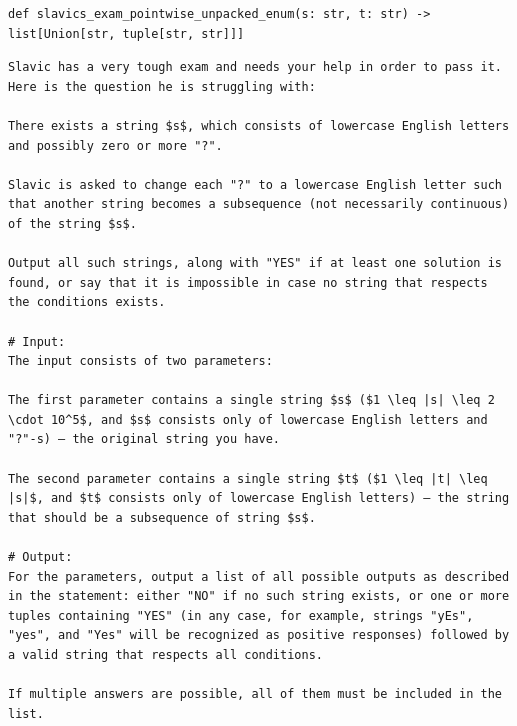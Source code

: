 \documentclass[acmsmall,screen,nonacm]{acmart}
\begin{document}
{\scriptsize
\begin{tcolorbox}[mybox,breakable,title={Answer enumeration problem}]
\begin{verbatim}
def slavics_exam_pointwise_unpacked_enum(s: str, t: str) -> list[Union[str, tuple[str, str]]]
\end{verbatim}
\begin{verbatim}
Slavic has a very tough exam and needs your help in order to pass it. Here is the question he is struggling with:

There exists a string $s$, which consists of lowercase English letters and possibly zero or more "?".

Slavic is asked to change each "?" to a lowercase English letter such that another string becomes a subsequence (not necessarily continuous) of the string $s$.

Output all such strings, along with "YES" if at least one solution is found, or say that it is impossible in case no string that respects the conditions exists.

# Input:
The input consists of two parameters:

The first parameter contains a single string $s$ ($1 \leq |s| \leq 2 \cdot 10^5$, and $s$ consists only of lowercase English letters and "?"-s) — the original string you have.

The second parameter contains a single string $t$ ($1 \leq |t| \leq |s|$, and $t$ consists only of lowercase English letters) — the string that should be a subsequence of string $s$.

# Output:
For the parameters, output a list of all possible outputs as described in the statement: either "NO" if no such string exists, or one or more tuples containing "YES" (in any case, for example, strings "yEs", "yes", and "Yes" will be recognized as positive responses) followed by a valid string that respects all conditions.

If multiple answers are possible, all of them must be included in the list.
\end{verbatim}
\end{tcolorbox}
}
\end{document}
